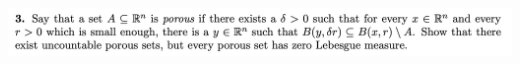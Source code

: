









\newpage
\begin{mdframed}
  \includegraphics[width=400pt]{img/analysis--berkeley-202a-final-ef68.png}
\end{mdframed}


